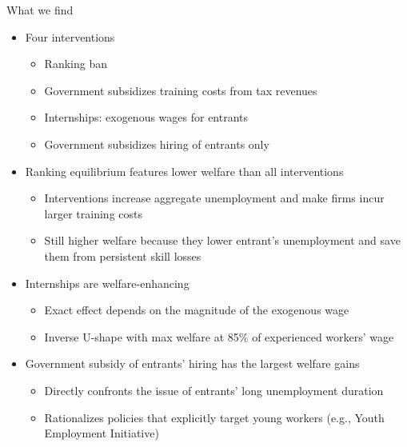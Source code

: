 \documentclass[9pt,xcolor={svgnames}]{beamer}
\begin{document}
\begin{frame}{What we find}
\begin{itemize}
\setlength\itemsep{1.4em}

    \item Four interventions
    \smallskip
    \begin{itemize}
    \item Ranking ban
    \item Government subsidizes training costs from tax revenues
    \item Internships: exogenous wages for entrants
    \item Government subsidizes hiring of entrants only
    \end{itemize}

    \item Ranking equilibrium features lower welfare than all interventions
    \smallskip
    \begin{itemize}
    \item Interventions increase aggregate unemployment and make firms incur larger training costs
    \item Still higher welfare because they lower entrant's unemployment and save them from persistent skill losses
    \end{itemize}

    \item Internships are welfare-enhancing
    \smallskip
    \begin{itemize}
    \item Exact effect depends on the magnitude of the exogenous wage
    \item Inverse U-shape with max welfare at 85\% of experienced workers' wage
    \end{itemize}

    \item Government subsidy of entrants' hiring has the largest welfare gains
    \smallskip
    \begin{itemize}
    \item Directly confronts the issue of entrants' long unemployment duration
    \item Rationalizes policies that explicitly target young workers (e.g., Youth Employment Initiative)
    \end{itemize}

\end{itemize}
\end{frame}
\end{document}
